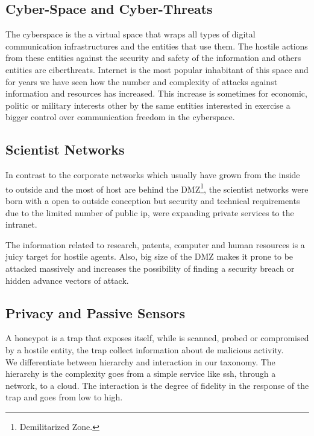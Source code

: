 \documentclass[a4paper]{llncs}
\begin{document}
\subsection{Cyber-Space and Cyber-Threats}
\label{sect:Scientist Networks}

The cyberspace is the a virtual space that wraps all types of digital communication infrastructures and the entities that use them. The hostile actions from these entities against the security and safety of the information and others entities are ciberthreats. Internet is the most popular inhabitant of this space and for years we have seen how the number and complexity of attacks against information and resources has increased. This increase is sometimes for economic, politic or military interests other by the same entities interested in exercise a bigger control over communication freedom in the cyberspace.


\subsection{Scientist Networks}
\label{sect:Scientist Networks}
In contrast to the corporate networks which usually have grown from the inside to outside and the most of host are behind the DMZ\footnote{Demilitarized Zone.}, the scientist networks were born with a open to outside conception but security and technical requirements due to the limited number of public ip, were expanding private services to the intranet.

The information related to research, patents, computer and human resources is a juicy target for hostile agents. Also, big size of the DMZ makes it prone to be attacked massively and increases the possibility of finding a security breach or hidden advance vectors of attack.

\subsection{Privacy and Passive Sensors}
\label{sect:Privacy and Passive Sensors}
A honeypot is a trap that exposes itself, while is scanned, probed or compromised by a hostile entity, the trap collect information about de malicious activity.
\\We differentiate between hierarchy and interaction in our taxonomy. The hierarchy is the complexity goes from a simple service like ssh, through a network, to a cloud. The interaction is the degree of fidelity in the response of the trap and goes from low to high. 
\end{document}
